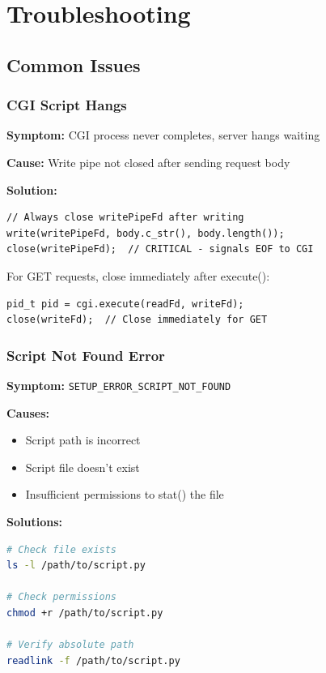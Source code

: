 \documentclass[11pt,a4paper]{article}
\begin{document}
\newpage
\section{Troubleshooting}

\subsection{Common Issues}

\subsubsection{CGI Script Hangs}

\textbf{Symptom:} CGI process never completes, server hangs waiting

\textbf{Cause:} Write pipe not closed after sending request body

\textbf{Solution:}
\begin{lstlisting}
// Always close writePipeFd after writing
write(writePipeFd, body.c_str(), body.length());
close(writePipeFd);  // CRITICAL - signals EOF to CGI
\end{lstlisting}

For GET requests, close immediately after execute():
\begin{lstlisting}
pid_t pid = cgi.execute(readFd, writeFd);
close(writeFd);  // Close immediately for GET
\end{lstlisting}

\subsubsection{Script Not Found Error}

\textbf{Symptom:} \texttt{SETUP\_ERROR\_SCRIPT\_NOT\_FOUND}

\textbf{Causes:}
\begin{itemize}
    \item Script path is incorrect
    \item Script file doesn't exist
    \item Insufficient permissions to stat() the file
\end{itemize}

\textbf{Solutions:}
\begin{lstlisting}[language=bash]
# Check file exists
ls -l /path/to/script.py

# Check permissions
chmod +r /path/to/script.py

# Verify absolute path
readlink -f /path/to/script.py
\end{lstlisting}
\end{document}
